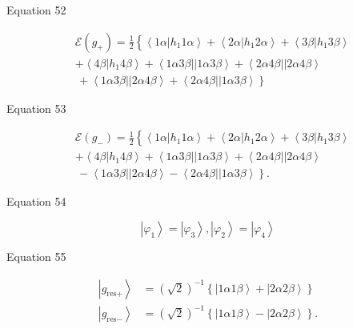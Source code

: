 \documentclass{article}
\begin{document}
Equation 52

\begin{align*}
& \mathcal{E}\left( g_{+}\right) =\frac{1}{2}\left\{ \overset{}{\left\langle
1\alpha \left\vert h_{1}1\alpha \right. \right\rangle +\left\langle 2\alpha
\left\vert h_{1}2\alpha \right. \right\rangle +\left\langle 3\beta
\left\vert h_{1}3\beta \right. \right\rangle }\right.  \\
& +\left\langle 4\beta \left\vert h_{1}4\beta \right. \right\rangle
+\left\langle 1\alpha 3\beta \right\vert \left\vert 1\alpha 3\beta
\right\rangle +\left\langle 2\alpha 4\beta \right\vert \left\vert 2\alpha
4\beta \right\rangle  \\
& \left. \,+\left\langle 1\alpha 3\beta \right\vert \left\vert 2\alpha
4\beta \right\rangle +\left\langle 2\alpha 4\beta \right\vert \left\vert
1\alpha 3\beta \right\rangle \overset{}{}\right\} 
\end{align*}

Equation 53

\begin{align*}
& \mathcal{E}\left( g_{-}\right) =\frac{1}{2}\left\{ \overset{}{\left\langle
1\alpha \left\vert h_{1}1\alpha \right. \right\rangle +\left\langle 2\alpha
\left\vert h_{1}2\alpha \right. \right\rangle +\left\langle 3\beta
\left\vert h_{1}3\beta \right. \right\rangle }\right.  \\
& +\left\langle 4\beta \left\vert h_{1}4\beta \right. \right\rangle
+\left\langle 1\alpha 3\beta \right\vert \left\vert 1\alpha 3\beta
\right\rangle +\left\langle 2\alpha 4\beta \right\vert \left\vert 2\alpha
4\beta \right\rangle  \\
& \left. \,-\left\langle 1\alpha 3\beta \right\vert \left\vert 2\alpha
4\beta \right\rangle -\left\langle 2\alpha 4\beta \right\vert \left\vert
1\alpha 3\beta \right\rangle \overset{}{}\right\} .
\end{align*}

Equation 54

\begin{equation}
\left\vert \varphi _{1}\right\rangle =\left\vert \varphi _{3}\right\rangle
,\left\vert \varphi _{2}\right\rangle =\left\vert \varphi _{4}\right\rangle 
\nonumber
\end{equation}

Equation 55

\begin{align*}
\left\vert g_{\text{res}+}\right\rangle & =\left( \sqrt{2}\right)
^{-1}\left\{ \left\vert 1\alpha 1\beta \right\rangle +\left\vert 2\alpha
2\beta \right\rangle \right\}  \\
\left\vert g_{\text{res}-}\right\rangle & =\left( \sqrt{2}\right)
^{-1}\left\{ \left\vert 1\alpha 1\beta \right\rangle -\left\vert 2\alpha
2\beta \right\rangle \right\} .
\end{align*}
\end{document}
